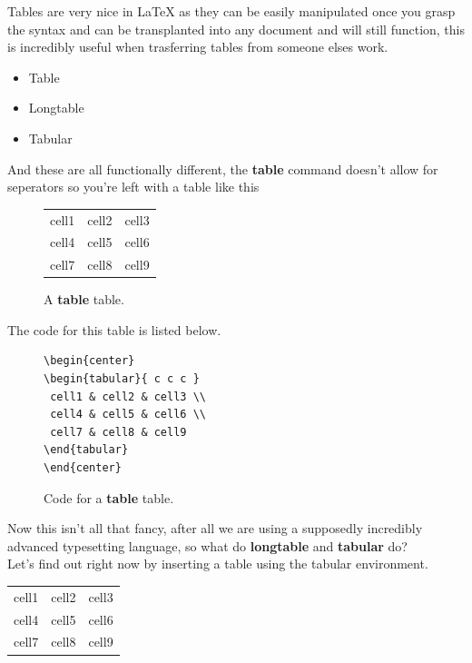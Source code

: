 \documentclass[12pt, letterpaper, oneside]{article} \usepackage[utf8]{inputenc}
\begin{document}
Tables are very nice in \LaTeX{} as they can be easily manipulated once you grasp the syntax and can be transplanted into any document and will still function, this is incredibly useful when trasferring tables from someone elses work.

\begin{itemize}
	\item Table
	\item Longtable
	\item Tabular
\end{itemize}


And these are all functionally different, the \textbf{table} command doesn't allow for seperators so you're left with a table like this

\begin{figure}[H]
\begin{center}
\begin{tabular}{ c c c }
 cell1 & cell2 & cell3 \\ 
 cell4 & cell5 & cell6 \\  
 cell7 & cell8 & cell9    
\end{tabular}
\end{center}
	\caption{A \textbf{table} table.}
\end{figure}

The code for this table is listed below.

\begin{figure}[H]
\begin{lstlisting}
\begin{center}
\begin{tabular}{ c c c }
 cell1 & cell2 & cell3 \\ 
 cell4 & cell5 & cell6 \\  
 cell7 & cell8 & cell9    
\end{tabular}
\end{center}
\end{lstlisting}
	\caption{Code for a \textbf{table} table.}
\end{figure}

Now this isn't all that fancy, after all we are using a supposedly incredibly advanced typesetting language, so what do \textbf{longtable} and \textbf{tabular} do?
\\
Let's find out right now by inserting a table using the tabular environment.

\begin{center}
\begin{tabular}{ |c|c|c| } 
 \hline
 cell1 & cell2 & cell3 \\ 
 cell4 & cell5 & cell6 \\ 
 cell7 & cell8 & cell9 \\ 
 \hline
\end{tabular}
\end{center}
\end{document}
